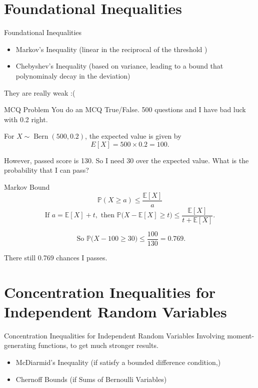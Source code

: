 \documentclass[aspectratio=169, handout]{beamer}
\begin{document}
\section{Foundational Inequalities}
\frame{\sectionpage}

\begin{frame}{Foundational Inequalities}
     \begin{itemize}
        \item  Markov’s Inequality (linear in the reciprocal of the threshold )\pause
        \item  Chebyshev’s Inequality (based on variance, leading to a bound that polynominaly decay in the deviation) \pause
    \end{itemize}

    They are really weak :(
\end{frame}

\begin{frame}{MCQ Problem}
   You do an MCQ True/False. 500 questions and I have bad luck with 0.2 right.   

   For \( X \sim \operatorname{Bern}(500,0.2) \), the expected value is given by
\[
E[X] = 500 \times 0.2 = 100.
\]
   
   However, passed score is 130. So I need 30 over the expected value. What is the probability that I can pass? 
\end{frame}



\begin{frame}{Markov Bound}
    \[
    \mathbb{P}(X \ge a) \le \frac{\mathbb{E}[X]}{a}
    \]  \pause
    \[
    \text{If } a = \mathbb{E}[X] + t, \text{ then } \mathbb{P}\bigl(X - \mathbb{E}[X] \ge t\bigr) \le \frac{\mathbb{E}[X]}{t + \mathbb{E}[X]}.
    \] \pause

    \[
    \text{ So } \mathbb{P}\bigl(X - 100 \ge 30\bigr) \le \frac{100}{130} = 0.769.
    \]

     There still 0.769 chances I passes. 
\end{frame}


\section{Concentration Inequalities for Independent Random Variables}
\frame{\sectionpage}

\begin{frame}{Concentration Inequalities for Independent Random Variables}
Involving moment-generating functions, to get much stronger results.
    \begin{itemize}
        \item  McDiarmid’s Inequality (if satisfy a bounded difference condition,) \pause
        \item  Chernoff Bounds (if Sums of Bernoulli Variables)
    \end{itemize}
\end{frame}
\end{document}
